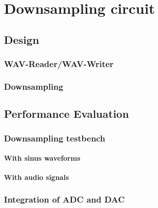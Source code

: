 \chapter{Downsampling circuit}

\section{Design}

\subsection{WAV-Reader/WAV-Writer}
\subsection{Downsampling}

\section{Performance Evaluation}

\subsection{Downsampling testbench}

\subsubsection{With sinus waveforms}

\subsubsection{With audio signals}

\subsection{Integration of ADC and DAC}



